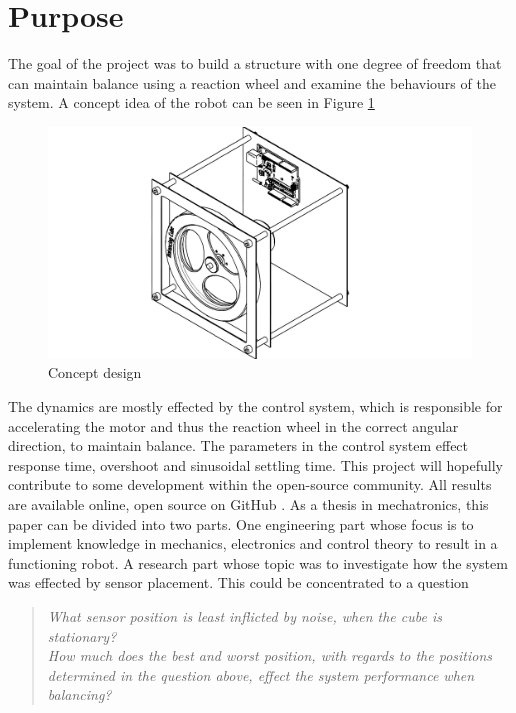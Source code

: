 \documentclass[a4paper,11pt]{kth-mag}
\begin{document}
\section{Purpose}
The goal of the project was to build a structure with one degree of freedom that can maintain balance using a reaction wheel and examine the behaviours of the system. A concept idea of the robot can be seen in Figure \ref{Figure: concept idea}
\begin{figure}[!htb] 
\centering
\includegraphics[width = \textwidth]{concept.pdf}
\caption{Concept design}
\label{Figure: concept idea}
\end{figure}

The dynamics are mostly effected by the control system, which is responsible for accelerating the motor and thus the reaction wheel in the  correct angular direction, to maintain balance. The parameters in the control system effect response time, overshoot and sinusoidal settling time.
This project will hopefully contribute to some development within the open-source community.
All results are available online, open source on GitHub \cite{Github}.
As a thesis in mechatronics, this paper can be divided into two parts. One engineering part whose focus is to implement knowledge in mechanics, electronics and control theory to result in a functioning robot. A research part whose topic was to investigate how the system was effected by sensor placement. This could be concentrated to a question 

\begin{quote}
\textit{
What sensor position is least inflicted by noise, when the cube is stationary?
} \\

\textit{How much does the best and worst position, with regards to the positions determined in the question above, effect the system performance when balancing?
}
\end{quote}
\end{document}
